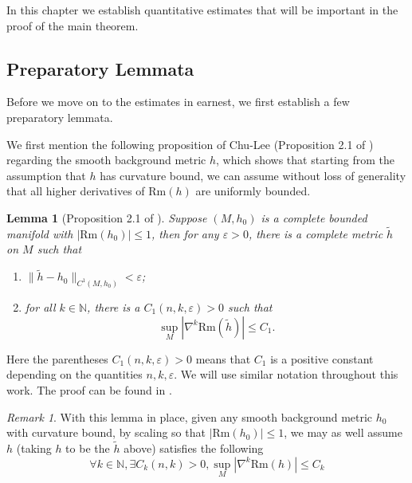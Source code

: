 \documentclass[12pt]{amsart}
\theoremstyle{plain}
\theoremstyle{plain}
\newtheorem{lemma}[subsection]{Lemma}
\theoremstyle{definition}
\theoremstyle{remark}
\newtheorem{remark}[subsection]{Remark}
\numberwithin{equation}{subsection}
\newcommand{\del}{\nabla}
\begin{document}
In this chapter we establish quantitative estimates that will be important in the proof of the main theorem.

\subsection{Preparatory Lemmata}

Before we move on to the estimates in earnest, we first establish a few preparatory lemmata.

We first mention the following proposition of Chu-Lee (Proposition 2.1 of \cite{chu_ricci-deturck_2022}) regarding the smooth background metric $h$, which shows that starting from the assumption that $h$ has curvature bound, we can assume without loss of generality that all higher derivatives of $\text{Rm}(h)$ are uniformly bounded.

\begin{lemma}[Proposition 2.1 of \cite{chu_ricci-deturck_2022}]\label{lem:estimates-h-star}
    Suppose $(M, h_0)$ is a complete bounded manifold with $|\text{Rm}(h_0)|\leq 1$, then for any $\varepsilon > 0$, there is a complete metric $\tilde{h}$ on $M$ such that
    \begin{enumerate}
        \item $\lVert \tilde{h} - h_0\rVert_{C^1(M,h_0)} < \varepsilon$;
        \item for all $k \in \mathbb{N}$, there is a $C_1(n,k,\varepsilon) > 0$ such that
        \begin{equation*}
            \sup\limits_M |\del^k \text{Rm}(\tilde{h})| \leq C_1.
        \end{equation*}
    \end{enumerate}
\end{lemma}

Here the parentheses $C_1(n,k,\varepsilon) > 0$ means that $C_1$ is a positive constant depending on the quantities $n, k, \varepsilon$. We will use similar notation throughout this work. The proof can be found in \cite{chu_ricci-deturck_2022}.

\begin{remark}\label{rmk:estimates-h-remark}
With this lemma in place, given any smooth background metric $h_0$ with curvature bound, by scaling so that $|\text{Rm}(h_0)|\leq 1$, we may as well assume $h$ (taking $h$ to be the $\tilde{h}$ above) satisfies the following
\begin{equation}\label{eqn:h-remark-curvature-estimates}
    \forall k \in \mathbb{N}, \exists C_k(n,k) > 0, \sup\limits_{M}|\del^k\text{Rm}(h)| \leq C_k
\end{equation}
\end{remark}
\end{document}
